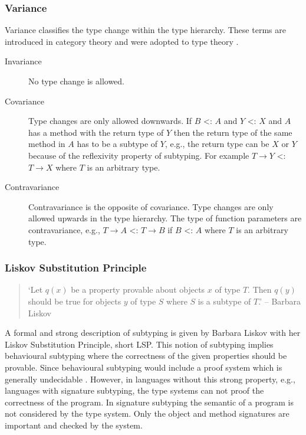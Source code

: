 \subsubsection{Variance}
Variance classifies the type change within the type hierarchy. These
terms are introduced in category theory and were adopted to type theory
\cite{pierce_basic_1991}.

\begin{description}
	\item[Invariance] No type change is allowed.
	\item[Covariance] Type changes are only allowed downwards. If $B$
	<: $A$ and $Y$ <: $X$ and $A$ has a method with the return
	type of $Y$ then the return type of the same method in $A$
	has to be a subtype of $Y$, e.g., the return type can be $X$
	or $Y$ because of the reflexivity property of subtyping. For
	example $T \rightarrow Y$ <: $T \rightarrow X$ where $T$ is an
	arbitrary type.
	\item[Contravariance] Contravariance is the opposite of
	covariance. Type changes are only allowed upwards in the type
	hierarchy. The type of function parameters are contravariance,
	e.g., $T \rightarrow A$ <: $T \rightarrow B$ if $B$ <: $A$ where
	$T$ is an arbitrary type.
\end{description}

\subsubsection{Liskov Substitution Principle}
\begin{quotation}
`Let $q(x)$ be a property provable about objects $x$ of type $T$. Then
$q(y)$ should be true for objects $y$ of type $S$ where $S$ is a subtype
of $T$.' -- Barbara Liskov \cite{liskov_behavioral_1999}
\end{quotation}

A formal and strong description of subtyping is given by Barbara
Liskov with her Liskov Substitution Principle, short LSP. This notion
of subtyping implies behavioural subtyping where the correctness
of the given properties should be provable. Since behavioural
subtyping would include a proof system which is generally undecidable
\cite{poll_behavioural_1998}. However, in languages without this strong
property, e.g., languages with signature subtyping, the type systems
can not proof the correctness of the program. In signature subtyping
the semantic of a program is not considered by the type system. Only
the object and method signatures are important and checked by the system.

